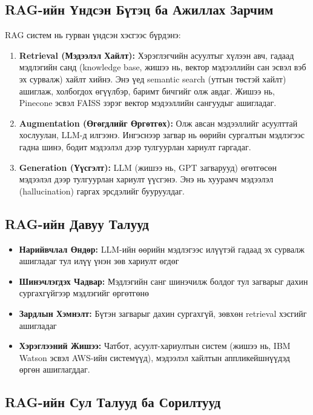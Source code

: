 \documentclass[12pt,A4]{report}
\begin{document}
\subsection{RAG-ийн Үндсэн Бүтэц ба Ажиллах Зарчим}

RAG систем нь гурван үндсэн хэсгээс бүрдэнэ:

\begin{enumerate}
    \item{\textbf{Retrieval (Мэдээлэл Хайлт):}} Хэрэглэгчийн асуултыг хүлээн авч, гадаад мэдлэгийн санд (knowledge base, жишээ нь, вектор мэдээллийн сан эсвэл вэб эх сурвалж) хайлт хийнэ. Энэ үед semantic search (утгын төстэй хайлт) ашиглаж, холбогдох өгүүлбэр, баримт бичгийг олж авдаг. Жишээ нь, Pinecone эсвэл FAISS зэрэг вектор мэдээллийн сангуудыг ашигладаг.\cite{rag1}

    \item{\textbf{Augmentation (Өгөгдлийг Өргөтгөх):}} Олж авсан мэдээллийг асуулттай хослуулан, LLM-д илгээнэ. Ингэснээр загвар нь өөрийн сургалтын мэдлэгээс гадна шинэ, бодит мэдээлэл дээр тулгуурлан хариулт гаргадаг.

    \item{\textbf{Generation (Үүсгэлт):}} LLM (жишээ нь, GPT загварууд) өгөтгөсөн мэдээлэл дээр тулгуурлан хариулт үүсгэнэ. Энэ нь хуурамч мэдээлэл (hallucination) гаргах эрсдэлийг бууруулдаг.\cite{rag2}
\end{enumerate}

\subsection{RAG-ийн Давуу Талууд}

\begin{itemize}
    \item \textbf{Нарийвчлал Өндөр:} LLM-ийн өөрийн мэдлэгээс илүүтэй гадаад эх сурвалж ашигладаг тул илүү үнэн зөв хариулт өгдөг\cite{rag3}
    \item \textbf{Шинэчлэгдэх Чадвар:} Мэдлэгийн санг шинэчилж болдог тул загварыг дахин сургахгүйгээр мэдлэгийг өргөтгөнө
    \item \textbf{Зардлын Хэмнэлт:} Бүтэн загварыг дахин сургахгүй, зөвхөн retrieval хэсгийг ашигладаг
    \item \textbf{Хэрэглээний Жишээ:} Чатбот, асуулт-хариултын систем (жишээ нь, IBM Watson эсвэл AWS-ийн системүүд), мэдээлэл хайлтын аппликейшнүүдэд өргөн ашиглагддаг. \cite{rag4}
\end{itemize}

\subsection{RAG-ийн Сул Талууд ба Сорилтууд}
\end{document}
